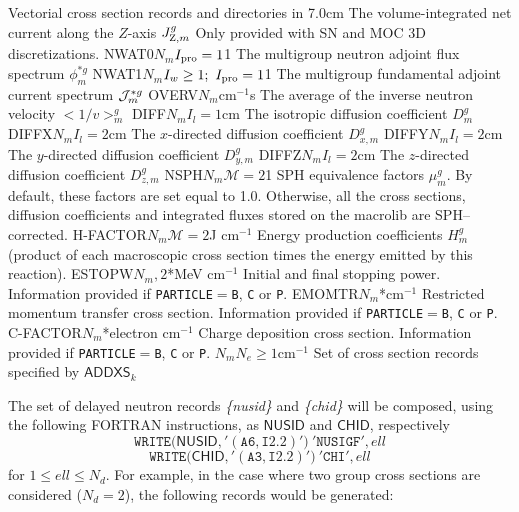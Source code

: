 \begin{DescriptionEnregistrement}{Vectorial cross section records and directories in
}{7.0cm}
  {The volume-integrated net current along the $Z$-axis $J_{{\rm Z},m}^{g}$ Only provided
  with SN and MOC 3D discretizations.}
\OptRealEnr
  {NWAT0}{$N_{m}$}{$I_{\rm pro}=1$}{1}
  {The multigroup neutron adjoint flux spectrum $\phi_{m}^{*g}$} 
\OptRealEnr
  {NWAT1}{$N_{m}$}{$I_{w}\ge 1; \ I_{\rm pro}=1$}{1}
  {The multigroup fundamental adjoint current spectrum ${\cal J}_{m}^{*g}$} 
\RealEnr
  {OVERV}{$N_{m}$}{cm$^{-1}$s}  
  {The average of the inverse neutron velocity \hbox{$<1/v>_{m}^g$}}
\OptRealEnr
  {DIFF}{$N_{m}$}{$I_{l}=1$}{cm}  
  {The isotropic diffusion coefficient
   $D_{m}^{g}$}
\OptRealEnr
  {DIFFX}{$N_{m}$}{$I_{l}=2$}{cm}  
  {The $x$-directed diffusion coefficient
   $D_{x,m}^{g}$}
\OptRealEnr
  {DIFFY}{$N_{m}$}{$I_{l}=2$}{cm}  
  {The $y$-directed diffusion coefficient
   $D_{y,m}^{g}$}
\OptRealEnr
  {DIFFZ}{$N_{m}$}{$I_{l}=2$}{cm}  
  {The $z$-directed diffusion coefficient
   $D_{z,m}^{g}$}
\OptRealEnr
  {NSPH}{$N_{m}$}{$\mathcal{M}=2$}{1}  
  {SPH equivalence factors $\mu_{m}^{g}$. By default, these factors are set equal to 1.0.
  Otherwise, all the cross sections, diffusion coefficients and integrated fluxes stored on the {\sc
  macrolib} are SPH--corrected.}
\OptRealEnr
  {H-FACTOR}{$N_{m}$}{$\mathcal{M}=2$}{J cm$^{-1}$}  
  {Energy production coefficients $H_{m}^{g}$ (product of each macroscopic cross section
  times the energy emitted by this reaction).}
\OptRealEnr
  {ESTOPW}{$N_{m},2$}{*}{MeV cm$^{-1}$}  
  {Initial and final stopping power. Information provided if {\tt PARTICLE}$=${\tt B}, {\tt C} or {\tt P}.}
\OptRealEnr
  {EMOMTR}{$N_{m}$}{*}{cm$^{-1}$}  
  {Restricted momentum transfer cross section. Information provided if {\tt PARTICLE}$=${\tt B}, {\tt C} or {\tt P}.}
\OptRealEnr
  {C-FACTOR}{$N_{m}$}{*}{electron cm$^{-1}$}  
  {Charge deposition cross section. Information provided if {\tt PARTICLE}$=${\tt B}, {\tt C} or {\tt P}.}
\OptRealVar
  {}{$N_{m}$}{$N_{e}\ge 1$}{cm$^{-1}$}
  {Set of cross section records specified by $\mathsf{ADDXS}_{k}$}
\end{DescriptionEnregistrement}

The set of delayed neutron records {\sl \{nusid\}} and {\sl \{chid\}} will be
composed, using the following FORTRAN instructions, as $\mathsf{NUSID}$ and $\mathsf{CHID}$,
respectively
  \begin{displaymath}
    \mathtt{WRITE(}\mathsf{NUSID}\mathtt{,'(A6,I2.2)')} \ \mathtt{'NUSIGF'},ell
  \end{displaymath}
  \begin{displaymath}
    \mathtt{WRITE(}\mathsf{CHID}\mathtt{,'(A3,I2.2)')} \ \mathtt{'CHI'},ell
  \end{displaymath}
for $1\leq ell \leq N_d$. For example, in the case where two group cross sections are considered
($N_d=2$), the following records would be generated:

